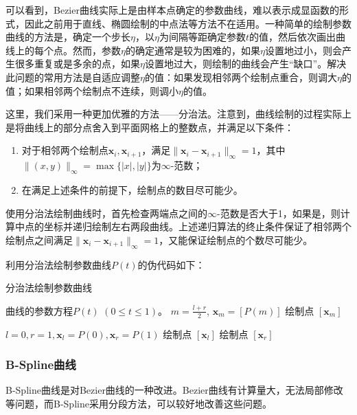 \documentclass[a4paper,12pt]{article}
\begin{document}
可以看到，Bezier曲线实际上是由样本点确定的参数曲线，难以表示成显函数的形式，因此之前用于直线、椭圆绘制的中点法等方法不在适用。一种简单的绘制参数曲线的方法是，确定一个步长$\eta$，以$\eta$为间隔等距确定参数$t$的值，然后依次画出曲线上的每个点。然而，参数$\eta$的确定通常是较为困难的，如果$\eta$设置地过小，则会产生很多重复或是多余的点，如果$\eta$设置地过大，则绘制的曲线会产生“缺口”。解决此问题的常用方法是自适应调整$\eta$的值：如果发现相邻两个绘制点重合，则调大$\eta$的值；如果相邻两个绘制点不连续，则调小$\eta$的值。

这里，我们采用一种更加优雅的方法——分治法。注意到，曲线绘制的过程实际上是将曲线上的部分点舍入到平面网格上的整数点，并满足以下条件：

\begin{enumerate}
	\item 对于相邻两个绘制点$\bm{x}_i, \bm{x}_{i+1}$，满足$\|\bm{x}_i - \bm{x}_{i+1}\|_{\infty} = 1$，其中$\| (x, y) \|_{\infty} = \max\{|x|, |y|\}$为$\infty$-范数；
	\item 在满足上述条件的前提下，绘制点的数目尽可能少。
\end{enumerate}

使用分治法绘制曲线时，首先检查两端点之间的$\infty$-范数是否大于1，如果是，则计算中点的坐标并递归绘制左右两段曲线。上述递归算法的终止条件保证了相邻两个绘制点之间满足$\|\bm{x}_i - \bm{x}_{i+1}\|_{\infty} = 1$，又能保证绘制点的个数尽可能少。

利用分治法绘制参数曲线$P(t)$的伪代码如下：

\begin{algorithm}[htb] 
	\caption{分治法绘制参数曲线} 
	\label{alg:CurveDC} 
	\begin{algorithmic}[1] 
		\Require 曲线的参数方程$P(t)$ $(0 \leq t \leq 1)$。
		\State \Return
		\Else
		\State $m = \frac{l+r}{2}$, $\bm{x}_m = [P(m)]$
		\State {}
		\State 绘制点 $[\bm{x}_m]$
		\State {}
		\EndIf
		\EndFunction
		
		\State $l = 0, r = 1, \bm{x}_l = P(0), \bm{x}_r = P(1)$
		\State 绘制点 $[\bm{x}_l]$
		\State {}
		\State 绘制点 $[\bm{x}_r]$
	\end{algorithmic} 
\end{algorithm}

\subsubsection{B-Spline曲线}
B-Spline曲线是对Bezier曲线的一种改进。Bezier曲线有计算量大，无法局部修改等问题，而B-Spline采用分段方法，可以较好地改善这些问题。
\end{document}
